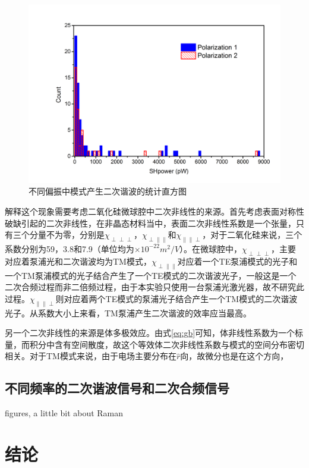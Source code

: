 \documentclass[UTF8,a4paper,cs4size,hyperref]{ctexart}
\begin{document}
\begin{figure}
\centering
\includegraphics[width=14cm ]{PolarizationHistogram}
\caption{不同偏振中模式产生二次谐波的统计直方图}
\label{pic:PolarizationHistogram}
\end{figure}

解释这个现象需要考虑二氧化硅微球腔中二次非线性的来源。首先考虑表面对称性破缺引起的二次非线性，在非晶态材料当中，表面二次非线性系数是一个张量，只有三个分量不为零，分别是$\chi_{\perp \perp \perp}$，$\chi_{\perp \parallel \parallel}$和$\chi_{\parallel \parallel \perp}$，对于二氧化硅来说，三个系数分别为59，3.8和7.9（单位均为$\times 10^{-22} m^2/V$）。在微球腔中，$\chi_{\perp \perp \perp}$，主要对应着泵浦光和二次谐波均为TM模式，$\chi_{\perp \parallel \parallel}$对应着一个TE泵浦模式的光子和一个TM泵浦模式的光子结合产生了一个TE模式的二次谐波光子，一般这是一个二次合频过程而非二倍频过程，由于本实验只使用一台泵浦光激光器，故不研究此过程。$\chi_{\parallel \parallel \perp}$则对应着两个TE模式的泵浦光子结合产生一个TM模式的二次谐波光子。从系数大小上来看，TM泵浦产生二次谐波的效率应当最高。

另一个二次非线性的来源是体多极效应。由式\ref{eq:gb}可知，体非线性系数为一个标量，而积分中含有空间散度，故这个等效体二次非线性系数与模式的空间分布密切相关。对于TM模式来说，由于电场主要分布在$\hat{r}$向，故微分也是在这个方向，

\subsection{不同频率的二次谐波信号和二次合频信号}

figures, a little bit about Raman

\section{结论}
\end{document}
